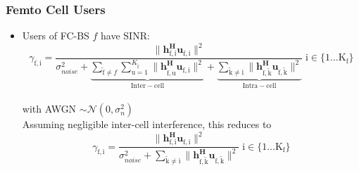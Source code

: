\documentclass[12pt]{article}
\begin{document}
\subsubsection{Femto Cell Users}
\begin{itemize}



\item Users of FC-BS $f$ have SINR:
	\begin{equation*}
	\gamma_{\mathrm{f,i}} = \frac{\|\mathbf{h^H_{\mathrm{f,i}}u_{\mathrm{f,i}}}\|^2}
	{\sigma^2_{noise}   +
	\underbrace{
	 \sum_{\mathrm{\tilde{f}}\neq f} \sum_{\mathrm{u=1}}^{K_{\mathrm{\tilde{f}}}}
	\|\mathbf{h^H_{\mathrm{\tilde{f},u}}u_{\mathrm{f,i}}}\|^2}_{\mathrm{Inter-cell}}
	 + 
	 \underbrace{
	 \sum_{\mathrm{\tilde{k}\neq i}}
	 \|\mathbf{h^H_{\mathrm{f,\tilde{k}}}u_{\mathrm{f,\tilde{k}}}}\|^2}_{\mathrm{Intra-cell}}}
	  \; \mathrm{i \in \{1 ... K_f\}}\end{equation*}
\\
with AWGN $\sim \mathcal{N}(0,\sigma^2_n)$
\\

Assuming negligible inter-cell interference, this reduces to
	\begin{equation*}
	\gamma_{\mathrm{f,i}} = \frac{\|\mathbf{h^H_{\mathrm{f,i}}u_{\mathrm{f,i}}}\|^2}
	{\sigma^2_{noise} 
	 + \sum_{\mathrm{\tilde{k}\neq i}}
	  \|\mathbf{h^H_{\mathrm{f,\tilde{k}}}u_{\mathrm{f,\tilde{k}}}}\|^2}
	  \; \mathrm{i \in \{1 ... K_f\}}
	\end{equation*}
\\

%

\end{itemize}
\end{document}
